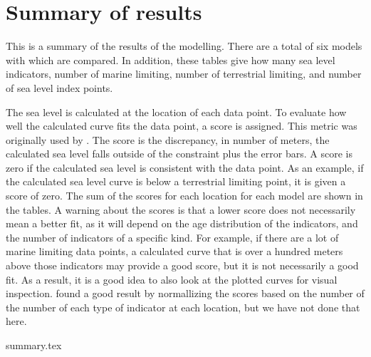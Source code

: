 \section{Summary of results}

This is a summary of the results of the modelling. There are a total of six models with which are compared. In addition, these tables give how many sea level indicators, number of marine limiting, number of terrestrial limiting, and number of sea level index points.

The sea level is calculated at the location of each data point. To evaluate how well the calculated curve fits the data point, a score is assigned. This metric was originally used by \citet{GowanEtal2016}. The score is the discrepancy, in number of meters, the calculated sea level falls outside of the constraint plus the error bars. A score is zero if the calculated sea level is consistent with the data point. As an example, if the calculated sea level curve is below a terrestrial limiting point, it is given a score of zero. The sum of the scores for each location for each model are shown in the tables. A warning about the scores is that a lower score does not necessarily mean a better fit, as it will depend on the age distribution of the indicators, and the number of indicators of a specific kind. For example, if there are a lot of marine limiting data points, a calculated curve that is over a hundred meters above those indicators may provide a good score, but it is not necessarily a good fit. As a result, it is a good idea to also look at the plotted curves for visual inspection. \citet{GowanEtal2016} found a good result by normallizing the scores based on the number of the number of each type of indicator at each location, but we have not done that here.

{summary.tex}
